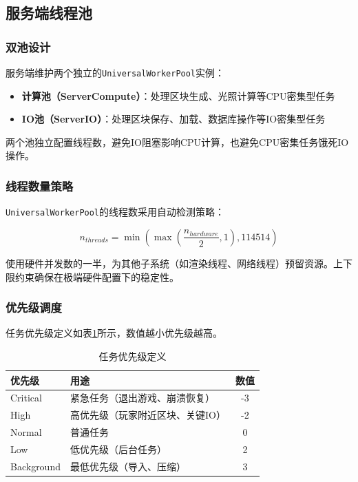 \subsection{服务端线程池}

\subsubsection{双池设计}

服务端维护两个独立的\texttt{UniversalWorkerPool}实例：

\begin{itemize}
    \item \textbf{计算池（ServerCompute）}：处理区块生成、光照计算等CPU密集型任务
    \item \textbf{IO池（ServerIO）}：处理区块保存、加载、数据库操作等IO密集型任务
\end{itemize}

两个池独立配置线程数，避免IO阻塞影响CPU计算，也避免CPU密集任务饿死IO操作。

\subsubsection{线程数量策略}

\texttt{UniversalWorkerPool}的线程数采用自动检测策略：

\begin{equation}
n_{threads} = \min\left(\max\left(\frac{n_{hardware}}{2}, 1\right), 114514\right)
\end{equation}

使用硬件并发数的一半，为其他子系统（如渲染线程、网络线程）预留资源。上下限约束确保在极端硬件配置下的稳定性。

\subsubsection{优先级调度}

任务优先级定义如表\ref{tab:task_priority}所示，数值越小优先级越高。

\begin{table}[h]
\centering
\caption{任务优先级定义}
\label{tab:task_priority}
\begin{tabular}{llc}
\toprule
\textbf{优先级} & \textbf{用途} & \textbf{数值} \\
\midrule
Critical & 紧急任务（退出游戏、崩溃恢复） & -3 \\
High & 高优先级（玩家附近区块、关键IO） & -2 \\
Normal & 普通任务 & 0 \\
Low & 低优先级（后台任务） & 2 \\
Background & 最低优先级（导入、压缩） & 3 \\
\bottomrule
\end{tabular}
\end{table}

